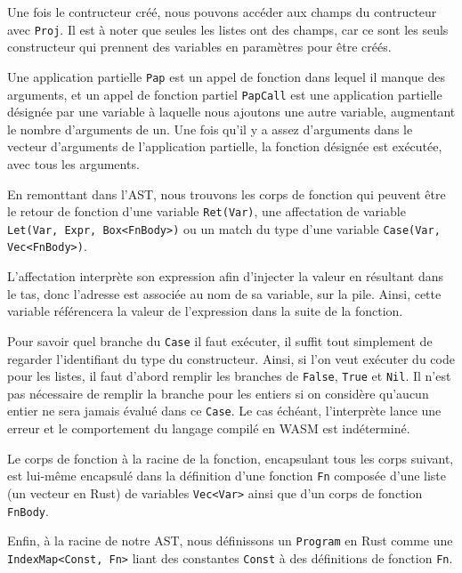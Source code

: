 \documentclass{rapportECL}
\begin{document}
Une fois le contructeur créé, nous pouvons accéder aux champs du contructeur avec \verb|Proj|.
Il est à noter que seules les listes ont des champs, car ce sont les seuls constructeur qui prennent
des variables en paramètres pour être créés.

\medskip

Une application partielle \verb|Pap| est un appel de fonction dans lequel il manque des arguments, 
et un appel de fonction partiel \verb|PapCall| est une application partielle désignée par une variable
à laquelle nous ajoutons une autre variable, augmentant le nombre d'arguments de un. 
Une fois qu'il y a assez d'arguments dans le vecteur d'arguments de l'application partielle,
la fonction désignée est exécutée, avec tous les arguments.

\bigskip

En remonttant dans l'AST, nous trouvons les corps de fonction qui peuvent être le retour de fonction d'une variable \verb|Ret(Var)|, 
une affectation de variable \verb|Let(Var, Expr, Box<FnBody>)| ou un match du type d'une variable 
\verb|Case(Var, Vec<FnBody>)|.

L'affectation interprète son expression afin d'injecter la valeur en résultant dans le tas, donc l'adresse est associée
au nom de sa variable, sur la pile. Ainsi, cette variable référencera la valeur de l'expression
dans la suite de la fonction.

\medskip

Pour savoir quel branche du \verb|Case| il faut exécuter, il suffit tout simplement de regarder
l'identifiant du type du constructeur. Ainsi, si l'on veut exécuter du code pour les listes,
il faut d'abord remplir les branches de \verb|False|, \verb|True| et \verb|Nil|.
Il n'est pas nécessaire de remplir la branche pour les entiers si on considère qu'aucun entier
ne sera jamais évalué dans ce \verb|Case|. Le cas échéant, l'interprète lance une erreur et le comportement
du langage compilé en WASM est indéterminé.

\medskip

Le corps de fonction à la racine de la fonction, encapsulant tous les corps suivant, 
est lui-même encapsulé dans la définition d'une fonction \verb|Fn| composée d'une liste (un vecteur en Rust) de variables \verb|Vec<Var>| ainsi que
d'un corps de fonction \verb|FnBody|.

\medskip

Enfin, à la racine de notre AST, nous définissons un \verb|Program| en Rust comme une \verb|IndexMap<Const, Fn>| liant des constantes \verb|Const| à 
des définitions de fonction \verb|Fn|.
\end{document}
